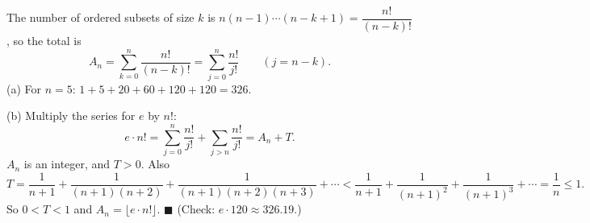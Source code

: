 The number of ordered subsets of size $k$ is $n(n-1)\cdots(n-k+1)=\dfrac{n!}{(n-k)!}$, so the total is
\[
A_n=\sum_{k=0}^{n}\dfrac{n!}{(n-k)!}=\sum_{j=0}^{n}\dfrac{n!}{j!}\qquad(j=n-k).
\]
(a) For $n=5$: $1+5+20+60+120+120=\boxed{326}$.

(b) Multiply the series for $e$ by $n!$:
\[
e\cdot n!=\sum_{j=0}^{n}\dfrac{n!}{j!}+\sum_{j>n}\dfrac{n!}{j!}=A_n+T .
\]
$A_n$ is an integer, and $T>0$. Also
\[
T=\dfrac{1}{n+1}+\dfrac{1}{(n+1)(n+2)}+\dfrac{1}{(n+1)(n+2)(n+3)}+\cdots<\dfrac{1}{n+1}+\dfrac{1}{(n+1)^2}+\dfrac{1}{(n+1)^3}+\cdots=\dfrac{1}{n}\le1 .
\]
So $0<T<1$ and $A_n=\lfloor e\cdot n!\rfloor$. $\blacksquare$ (Check: $e\cdot120\approx326.19$.)
